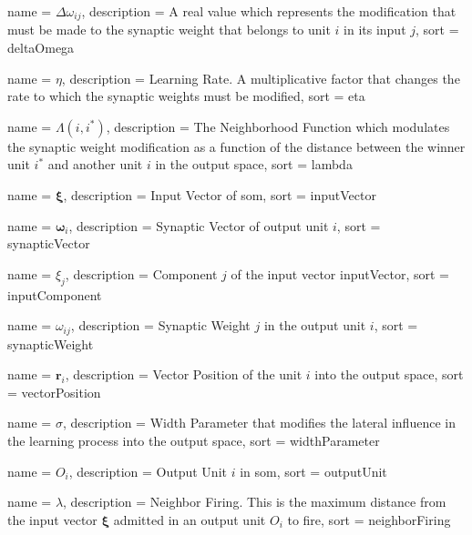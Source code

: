 
{
  name = {\ensuremath{\Delta \omega_{ij}}},
  description = {A real value which represents the modification that must be made to the synaptic weight that belongs to unit $i$ in its input $j$},
  sort  = deltaOmega
}

{
  name = {\ensuremath{\eta}},
  description = {Learning Rate. A multiplicative factor that changes the rate to which the synaptic weights must be modified},
  sort  = eta
}

{
  name = {\ensuremath{\Lambda(i,i^*)}},
  description = {The Neighborhood Function which modulates the synaptic weight modification as a function of the distance between the winner unit $i^*$ and another unit $i$ in the output space},
  sort  = lambda
}

{
  name = {\ensuremath{\boldsymbol{\xi}}},
  description = {Input Vector of \ac{som}},
  sort  = inputVector
}

{
  name = {\ensuremath{\boldsymbol{\omega}_i}},
  description = {Synaptic Vector of output unit $i$},
  sort  = synapticVector
}

{
  name = {\ensuremath{\xi_j}},
  description = {Component $j$ of the input vector \ac{inputVector}},
  sort  = inputComponent
}

{
  name = {\ensuremath{\omega_{ij}}},
  description = {Synaptic Weight $j$ in the output unit $i$},
  sort  = synapticWeight
}

{
  name = {\ensuremath{\boldsymbol{r}_i}},
  description = {Vector Position of the unit $i$ into the output space},
  sort  = vectorPosition
}

{
  name = {\ensuremath{\sigma}},
  description = {Width Parameter that modifies the lateral influence in the learning process into the output space},
  sort  = widthParameter
}

{
  name = {\ensuremath{O_i}},
  description = {Output Unit $i$ in \ac{som}},
  sort  = outputUnit
}

{
  name = {\ensuremath{\lambda}},
  description = {Neighbor Firing. This is the maximum distance from the input vector $\boldsymbol{\xi}$ admitted in an output unit $O_i$ to fire},
  sort  = neighborFiring
}

